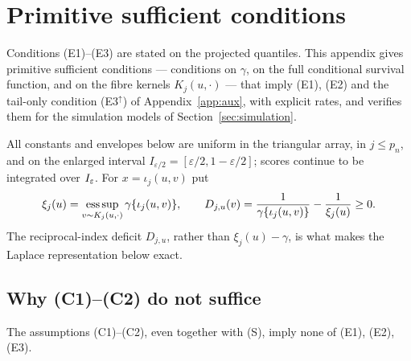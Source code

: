 \section{Primitive sufficient conditions}
\label{app:primitive}
\renewcommand{\theequation}{C.\arabic{equation}}
\setcounter{equation}{0}

Conditions (E1)--(E3) are stated on the projected quantiles. This
appendix gives primitive sufficient conditions --- conditions on
$\gamma$, on the full conditional survival function, and on the fibre
kernels $K_j(u,\cdot)$ --- that imply (E1), (E2) and the tail-only
condition (E3$^\uparrow$) of Appendix~\ref{app:aux}, with explicit
rates, and verifies them for the simulation models of
Section~\ref{sec:simulation}.

All constants and envelopes below are uniform in the triangular array,
in $j\le p_n$, and on the enlarged interval
$I_{\varepsilon/2}=[\varepsilon/2,1-\varepsilon/2]$; scores continue to
be integrated over $I_\varepsilon$. For $x=\iota_j(u,v)$ put
\begin{equation}\label{eq:deficit}
 \xi_j(u)=\operatorname*{ess\,sup}_{v\sim K_j(u,\cdot)}\gamma\{\iota_j(u,v)\},
 \qquad
 D_{j,u}(v)=\frac1{\gamma\{\iota_j(u,v)\}}-\frac1{\xi_j(u)}\ge0.
\end{equation}
The reciprocal-index deficit $D_{j,u}$, rather than
$\xi_j(u)-\gamma$, is what makes the Laplace representation below exact.

\subsection{Why (C1)--(C2) do not suffice}

\begin{proposition}\label{prop:app-necessary}
The assumptions (C1)--(C2), even together with (S), imply none of (E1),
(E2), (E3).
\end{proposition}

